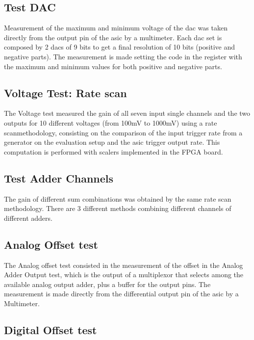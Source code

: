 \documentclass[main.tex]{subfiles}
\begin{document}
\subsection{Test DAC}

Measurement of the maximum and minimum voltage of the \gls{dac} was taken directly from the output pin of the \gls{asic} by a multimeter. Each \gls{dac} set is composed by 2 \glspl{dac} of 9 bits to get a final resolution of 10 bits (positive and negative parts). The measurement is made setting the code in the register with the maximum  and minimum values for both positive and negative parts.

\subsection{Voltage Test: Rate scan} \label{sec:ratescan}

The Voltage test measured the gain of all seven input single channels and the two outputs for 10 different voltages (from 100mV to 1000mV) using a rate scanmethodology, consisting on the comparison of the input trigger rate from a generator on the evaluation setup and the \gls{asic} trigger output rate. This computation is performed with scalers implemented in the FPGA board.

\subsection{Test Adder Channels}

The gain of different sum combinations was obtained by the same rate scan methodology. There are 3 different methods combining different channels of different adders.

\subsection{Analog Offset test}

The Analog offset test consisted in the measurement of the offset in the Analog Adder Output test, which is the output of a multiplexor that selects among the available analog output adder, plus a buffer for the output pins. The measurement is made directly from the differential output pin of the \gls{asic} by a Multimeter.

\subsection{Digital Offset test} \label{sec:digoff}
\end{document}
